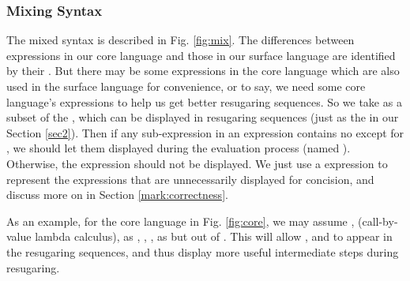 \subsubsection{Mixing Syntax}
The mixed syntax is described in Fig.  \ref{fig:mix}.
%
The differences between expressions in our core language and those in our surface language are identified by their . But there may be some expressions in the core language which are also used in the surface language for convenience, or to say, we need some core language's expressions to help us get better resugaring sequences. So we take  as a subset of the , which can be displayed in resugaring sequences (just as the  in our Section \ref{sec2}). Then if any sub-expression in an expression contains no  except for , we should let them displayed during the evaluation process (named ). Otherwise, the expression should not be displayed. We just use a  expression to represent the expressions that are unnecessarily displayed for concision, and discuss more on   in Section \ref{mark:correctness}.





As an example, for the core language in Fig.  \ref{fig:core},
we may assume , \m{$\lambda$} (call-by-value lambda calculus),  as , , ,  as  but out of . This will allow , \m{$\lambda$} and  to appear in the resugaring sequences, and thus display more useful intermediate steps during resugaring.

